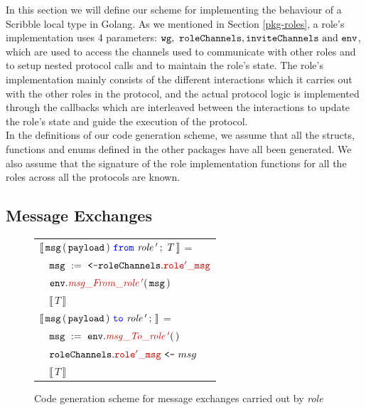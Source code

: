\documentclass[12pt,twoside]{report}
\begin{document}
In this section we will define our scheme for implementing the behaviour of a Scribble local type in Golang. As we mentioned in Section \ref{pkg-roles}, a role's implementation uses 4 parameters: $\varname{wg},\ \varname{roleChannels}, \varname{inviteChannels}\ \text{and}\ \varname{env}$, which are used to access the channels used to communicate with other roles and to setup nested protocol calls and to maintain the role's state. The role's implementation mainly consists of the different interactions which it carries out with the other roles in the protocol, and the actual protocol logic is implemented through the callbacks which are interleaved between the interactions to update the role's state and guide the execution of the protocol.\\

In the definitions of our code generation scheme, we assume that all the structs, functions and enums defined in the other packages have all been generated. We also assume that the signature of the role implementation functions for all the roles across all the protocols are known. 

\subsection{Message Exchanges}\label{msg-exchanges-impl}

\begin{figure}[!h]
    \begin{center}
        \begin{tabular}{l}
            $\llbracket\,\varname{msg}\,(\,\varname{payload}\,)\ \from\ \mathit{role\,'}\,;\ T\,\rrbracket$ =\\[10pt]
            
            $\quad \assignment{msg}{\texttt{<-}\structaccess{\rolechannels}{role'\_msg}}$\\[3pt]
            $\quad \methodcall{\envparam}{\functionname{msg\_From\_role\,'}}\params{\varname{msg}}$\\[3pt]
            
            $\quad \llbracket\,T\,\rrbracket$\\[30pt]
            
            $\llbracket\,\varname{msg}\,(\,\varname{payload}\,)\ \scrto\ \mathit{role\,'}\,;\,\rrbracket$ =\\[10pt]
            
            $\quad \assignment{msg}{\methodcall{\envparam}{msg\_To\_role\,'}\emptyparams}$\\[3pt]
            $\quad \chansend{\structaccess{\rolechannels}{role'\_msg}}{msg}$\\[3pt]

            $\quad \llbracket\,T\,\rrbracket$
            

        \end{tabular}
    \end{center}
    \caption{Code generation scheme for message exchanges carried out by \textit{role}}
    \label{message-exchange-codegen}
\end{figure}
\end{document}
